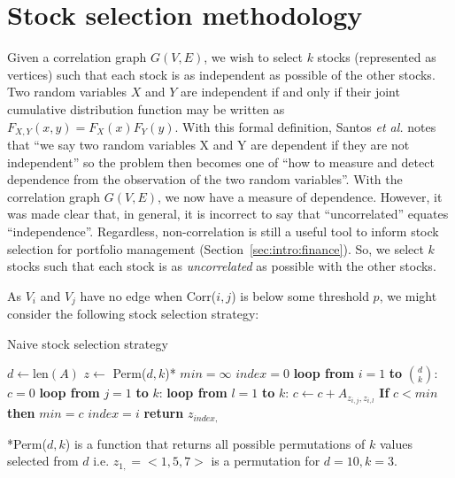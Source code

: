 \section{Stock selection methodology}
\label{sec:usage:stockselection}

Given a correlation graph $G(V,E)$, we wish to select $k$ stocks (represented 
as vertices) such that each stock is as independent as possible of the other 
stocks. Two random variables $X$ and $Y$ are independent if and only if their 
joint cumulative distribution function may be written as 
$F_{X,Y}(x,y)=F_X(x)F_Y(y)$. With this formal definition, Santos \textit{et 
al.} notes that ``we say two random variables X and Y are dependent if they
are not independent'' so the problem then becomes one of ``how to measure and 
detect dependence from the observation of the two random 
variables''\cite{santos2013}. With the correlation graph $G(V,E)$, we now have 
a measure of dependence. However, it was made clear that, in general, 
it is incorrect to say that ``uncorrelated'' equates ``independence''. 
Regardless, non-correlation is still a useful tool to inform stock selection 
for portfolio management (Section~\ref{sec:intro:finance}). So, we select $k$ 
stocks such that each stock is as \textit{uncorrelated} as possible with the 
other stocks.

As $V_i$ and $V_j$ have no edge when Corr($i,j$) is below some threshold $p$, 
we might consider the following stock selection strategy:

\tablespacing
\begin{algorithm}[H]
	\caption{Naive stock selection strategy}\label{euclid}
	\begin{algorithmic}[1]
		\State $d \gets \text{len}(A)$
		\State $z \gets$ Perm($d,k$)*
		\State $min = \infty$
		\State $index = 0$
		\State \textbf{loop from} $i=1$ \textbf{to} $d \choose k$:
		\State \indent $c = 0$
		\State \indent \textbf{loop from} $j = 1$ \textbf{to} $k$:
		\State \indent \indent \textbf{loop from} $l=1$ \textbf{to} $k$:
		\State \indent \indent \indent $c \gets c+A_{z_{i,j},z_{i,l}}$
		\State \indent \textbf{If} $c < min$ \textbf{then}
		\State \indent \indent $min = c$
		\State \indent \indent $index = i$
		\State \textbf{return} $z_{index,}$
		\EndProcedure
	\end{algorithmic}
	*Perm($d,k$) is a function that returns all possible permutations 
	of $k$ values selected from $d$ i.e. $z_{1,}=<1,5,7>$ is a permutation for 
	$d=10,k=3$.
\end{algorithm}
\bodyspacing

